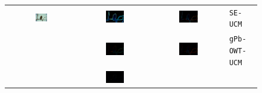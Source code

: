 \begin{figure}[t]
\begin{center}
  \begin{tabular}{ c c c l }
  \includegraphics[width=0.17\textwidth]{images/experiments/SE_sPb-OWT-UCM/eagle.png} &
  \includegraphics[width=0.28\textwidth]{images/experiments/SE_sPb-OWT-UCM/eagle_SE-UCM_Pb_not_nms.png} &
  \includegraphics[width=0.28\textwidth]{images/experiments/SE_sPb-OWT-UCM/eagle_SE-UCM_ucm_imageSize.png} &
  {\tiny \tt SE-UCM} \\
  &
  \includegraphics[width=0.28\textwidth]{images/experiments/SE_sPb-OWT-UCM/eagle_gPb-OWT-UCM_gPb_thin.png} &
  \includegraphics[width=0.28\textwidth]{images/experiments/SE_sPb-OWT-UCM/eagle_gPb-OWT-UCM_ucm_imageSize.png} &
  {\tiny \tt gPb-OWT-UCM} \\
  &
  \includegraphics[width=0.28\textwidth]{images/experiments/SE_sPb-OWT-UCM/eagle_(SE_sPb)-OWT-UCM_gPb_thin.png} &

\end{tabular}
\end{center}
\end{figure}
